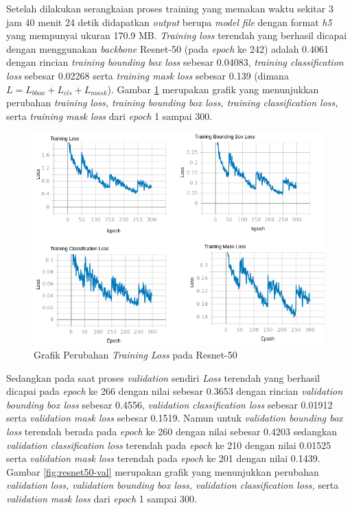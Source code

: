 Setelah dilakukan serangkaian proses training yang memakan waktu sekitar 3 jam 40 menit 24 detik didapatkan \textit{output} berupa \textit{model file}  dengan format \textit{h5} yang mempunyai ukuran 170.9 MB. \textit{Training loss} terendah yang berhasil dicapai dengan menggunakan \textit{backbone} Resnet-50 (pada \textit{epoch} ke 242) adalah 0.4061 dengan rincian \textit{training bounding box loss} sebesar 0.04083, \textit{training classification loss} sebesar 0.02268 serta \textit{training mask loss} sebesar 0.139 (dimana $L=L_{bbox}+L_{cls}+L_{mask}$). Gambar \ref{fig:resnet50-training} merupakan grafik yang menunjukkan perubahan \textit{training loss, training bounding box loss, training classification loss,} serta \textit{training mask loss} dari \textit{epoch} 1 sampai 300.

\begin{figure}[h]
	\centering
	\includegraphics[scale=0.36]{gambar/resnet50-training.png}
	\caption{Grafik Perubahan \textit{Training Loss} pada Resnet-50}
	\label{fig:resnet50-training}
\end{figure}

Sedangkan pada saat proses \textit{validation} sendiri \textit{Loss} terendah yang berhasil dicapai pada \textit{epoch} ke 266 dengan nilai sebesar 0.3653 dengan rincian \textit{validation bounding box loss} sebesar 0.4556, \textit{validation classification loss} sebesar 0.01912 serta \textit{validation mask loss} sebesar 0.1519. Namun untuk \textit{validation bounding box loss} terendah berada pada \textit{epoch} ke 260 dengan nilai sebesar 0.4203 sedangkan \textit{validation classification loss} terendah pada \textit{epoch} ke 210 dengan nilai 0.01525 serta \textit{validation mask loss} terendah pada \textit{epoch} ke 201 dengan nilai 0.1439. Gambar \ref{fig:resnet50-val} merupakan grafik yang menunjukkan perubahan \textit{validation loss, validation bounding box loss, validation classification loss,} serta \textit{validation mask loss} dari \textit{epoch} 1 sampai 300.

